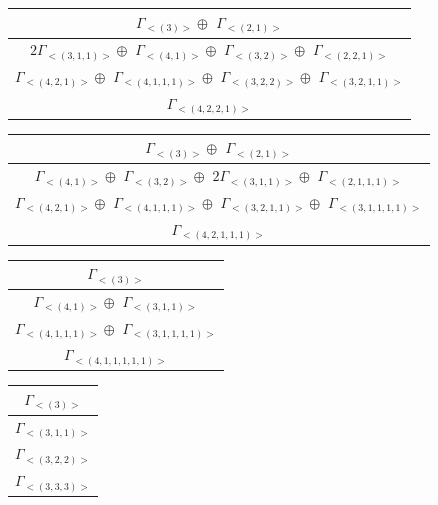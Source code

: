 \begin{minipage}{.6\textwidth}
\centering
\begin{tabular}{|c|}\hline
$\Gamma_{<(
3
)>} \oplus$
$\Gamma_{<(
2 , 
1
)>}$
\\ \hline
$ 2 \Gamma_{<(
3 , 
1 , 
1
)>} \oplus$
$\Gamma_{<(
4 , 
1
)>} \oplus$
$\Gamma_{<(
3 , 
2
)>} \oplus$
$\Gamma_{<(
2 , 
2 , 
1
)>}$
\\ \hline
$\Gamma_{<(
4 , 
2 , 
1
)>} \oplus$
$\Gamma_{<(
4 , 
1 , 
1 , 
1
)>} \oplus$
$\Gamma_{<(
3 , 
2 , 
2
)>} \oplus$
$\Gamma_{<(
3 , 
2 , 
1 , 
1
)>}$
\\ \hline
$\Gamma_{<(
4 , 
2 , 
2 , 
1
)>}$
\\
\hline\end{tabular}\end{minipage}
\bigskip
\begin{minipage}{.5\textwidth}
\centering
\begin{tabular}{|c|}\hline
$\Gamma_{<(
3
)>} \oplus$
$\Gamma_{<(
2 , 
1
)>}$
\\ \hline
$\Gamma_{<(
4 , 
1
)>} \oplus$
$\Gamma_{<(
3 , 
2
)>} \oplus$
$ 2 \Gamma_{<(
3 , 
1 , 
1
)>} \oplus$
$\Gamma_{<(
2 , 
1 , 
1 , 
1
)>}$
\\ \hline
$\Gamma_{<(
4 , 
2 , 
1
)>} \oplus$
$\Gamma_{<(
4 , 
1 , 
1 , 
1
)>} \oplus$
$\Gamma_{<(
3 , 
2 , 
1 , 
1
)>} \oplus$
$\Gamma_{<(
3 , 
1 , 
1 , 
1 , 
1
)>}$
\\ \hline
$\Gamma_{<(
4 , 
2 , 
1 , 
1 , 
1
)>}$
\\
\hline\end{tabular}\end{minipage}
\begin{minipage}{.57\textwidth}
\centering
\begin{tabular}{|c|}\hline
$\Gamma_{<(
3
)>}$
\\ \hline
$\Gamma_{<(
4 , 
1
)>} \oplus$
$\Gamma_{<(
3 , 
1 , 
1
)>}$
\\ \hline
$\Gamma_{<(
4 , 
1 , 
1 , 
1
)>} \oplus$
$\Gamma_{<(
3 , 
1 , 
1 , 
1 , 
1
)>}$
\\ \hline
$\Gamma_{<(
4 , 
1 , 
1 , 
1 , 
1 , 
1
)>}$
\\
\hline\end{tabular}\end{minipage}
\begin{minipage}{.123\textwidth}
\centering
\begin{tabular}{|c|}\hline
$\Gamma_{<(
3
)>}$
\\ \hline
$\Gamma_{<(
3 , 
1 , 
1
)>}$
\\ \hline
$\Gamma_{<(
3 , 
2 , 
2
)>}$
\\ \hline
$\Gamma_{<(
3 , 
3 , 
3
)>}$
\\
\hline\end{tabular}\end{minipage}
